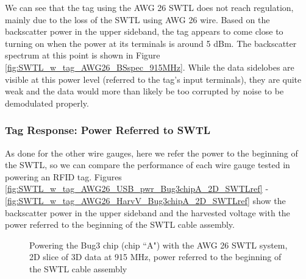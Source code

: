\documentclass[12pt,onecolumn,titlepage]{article}
\begin{document}
We can see that the tag using the AWG 26 SWTL does not reach regulation, mainly due to the loss of the SWTL using AWG 26 wire. Based on the backscatter power in the upper sideband, the tag appears to come close to turning on when the power at its terminals is around 5 dBm. The backscatter spectrum at this point is shown in Figure \ref{fig:SWTL_w_tag_AWG26_BSspec_915MHz}. While the data sidelobes are visible at this power level (referred to the tag's input terminals), they are quite weak and the data would more than likely  be too corrupted by noise to be demodulated properly. 




\subsubsection{Tag Response: Power Referred to SWTL}
\indent \indent As done for the other wire gauges, here we refer the power to the beginning of the SWTL, so we can compare the performance of each wire gauge tested in powering an RFID tag. Figures \ref{fig:SWTL_w_tag_AWG26_USB_pwr_Bug3chipA_2D_SWTLref} - \ref{fig:SWTL_w_tag_AWG26_HarvV_Bug3chipA_2D_SWTLref} show the backscatter power in the upper sideband and the harvested voltage with the power referred to the beginning of the SWTL cable assembly.



\begin{figure}[htbp]
	\centering
		\quad
	\label{fig:SWTL_w_tag_AWG26_2D_SWTLref}
	\caption{Powering the Bug3 chip (chip ``A") with the AWG 26 SWTL system, 2D slice of 3D data at 915 MHz, power referred to the beginning of the SWTL cable assembly }
\end{figure}
\end{document}
